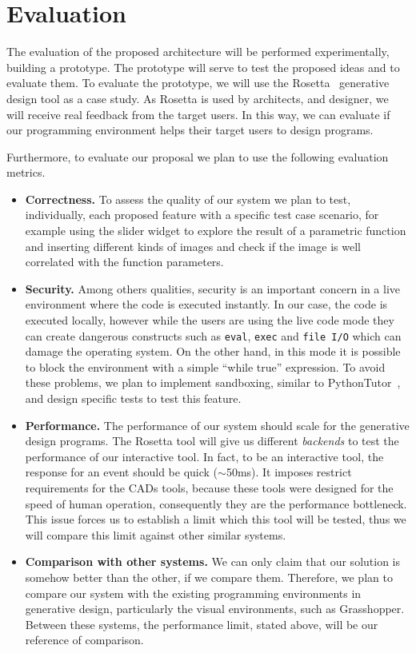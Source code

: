 \section{Evaluation}
\label{sec:eval}

The evaluation of the proposed architecture will be performed experimentally, building a prototype. The prototype will serve to test the proposed ideas and to evaluate them. To evaluate the prototype, we will use the Rosetta~\citep{lopes2011portable} generative design tool as a case study. As Rosetta is used by architects, and designer, we will receive real feedback from the target users. In this way, we can evaluate if our programming environment helps their target users to design programs.

Furthermore, to evaluate our proposal we plan to use the following evaluation metrics.

\begin{itemize}
\item \textbf{Correctness.} To assess the quality of our system we plan to test, individually, each proposed feature with a specific test case scenario, for example using the slider widget to explore the result of a parametric function and inserting different kinds of images and check if the image is well correlated with the function parameters. 

\item \textbf{Security.} Among others qualities, security is an important concern in a live environment where the code is executed instantly. In our case, the code is executed locally, however while the users are using the live code mode they can create dangerous constructs such as \texttt{eval}, \texttt{exec} and \texttt{file I/O} which can damage the operating system. On the other hand, in this mode it is possible to block the environment with a simple ``while true'' expression. To avoid these problems, we plan to implement sandboxing, similar to PythonTutor~\citep{GuoSIGCSE2013}, and design specific tests to test this feature.

\item \textbf{Performance.} The performance of our system should scale for the generative design programs. The Rosetta tool will give us different \textit{backends} to test the performance of our interactive tool. In fact, to be an interactive tool, the response for an event should be quick ($\sim$50ms). It imposes restrict requirements for the CADs tools, because these tools were designed for the speed of human operation, consequently they are the performance bottleneck. This issue forces us to establish a limit which this tool will be tested, thus we will compare this limit against other similar systems.

\item \textbf{Comparison with other systems.} We can only claim that our solution is somehow better than the other, if we compare them. Therefore, we plan to compare our system with the existing programming environments in generative design, particularly the visual environments, such as Grasshopper. Between these systems, the performance limit, stated above, will be our reference of comparison.
\end{itemize}